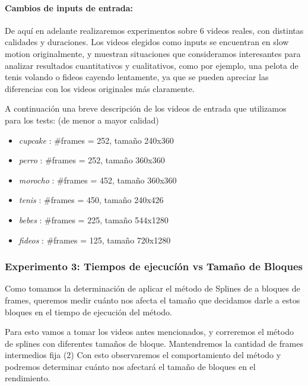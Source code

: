 \paragraph{Cambios de inputs de entrada:}
De aquí en adelante realizaremos experimentos sobre 6 videos reales, con distintas calidades y duraciones. Los videos elegidos como inputs se encuentran en slow motion originalmente, y muestran situaciones que consideramos interesantes para analizar resultados cuantitativos y cualitativos, como por ejemplo, una pelota de tenis volando o fideos cayendo lentamente, ya que se pueden apreciar las diferencias con los videos originales más claramente.
\par A continuación una breve descripción de los videos de entrada que utilizamos para los tests: (de menor a mayor calidad)
\begin{multicols}{2}
\begin{itemize}
\item \textit{cupcake} : $\#$frames = 252, tamaño 240x360
\item \textit{perro} : $\#$frames = 252, tamaño 360x360
\item \textit{morocho} : $\#$frames = 452, tamaño 360x360
\item \textit{tenis} : $\#$frames = 450, tamaño 240x426
\item \textit{bebes} : $\#$frames = 225, tamaño 544x1280
\item \textit{fideos} : $\#$frames = 125, tamaño 720x1280
\end{itemize}
\end{multicols}


\subsubsection{Experimento 3: Tiempos de ejecucí\'on vs Tama\~no de Bloques}
\par Como tomamos la determinación de aplicar el m\'etodo de Splines de a bloques de frames, queremos medir cu\'anto nos afecta el tama\~no que decidamos darle a estos bloques en el tiempo de ejecuci\'on del m\'etodo.

\par Para esto vamos a tomar los videos antes mencionados, y correremos el m\'etodo de splines con diferentes tama\~nos de bloque. Mantendremos la cantidad de frames intermedios fija (2) Con esto observaremos el comportamiento del m\'etodo y podremos determinar cu\'anto nos afectar\'a el tama\~no de bloques en el rendimiento.

